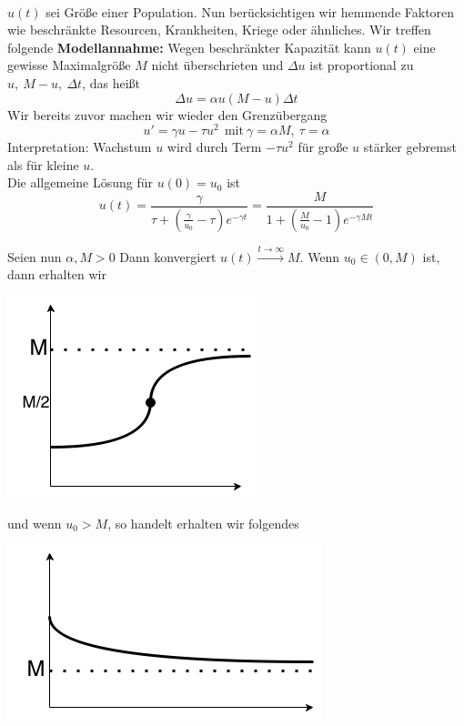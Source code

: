 \begin{beispiel}
\mbox{}\\
$u(t) $ sei Größe einer Population. Nun berücksichtigen wir  hemmende Faktoren wie beschränkte Resourcen, Krankheiten, Kriege oder ähnliches. Wir treffen folgende \textbf{Modellannahme:} Wegen beschränkter Kapazität kann $u(t) $
eine gewisse Maximalgröße $M$ nicht überschrieten und
$\Delta u $ ist proportional zu $u, \ M-u, \ \Delta t$, das heißt
\begin{equation*}
\Delta u = \alpha u(M-u) \Delta t 
\end{equation*}
Wir bereits zuvor machen wir wieder den Grenzübergang
\begin{equation*} 
u' = \gamma u - \tau u^2 \ \ \mathrm{mit\ }\gamma = \alpha M, \ \tau = \alpha
\end{equation*}  
Interpretation: Wachstum $u$ wird durch Term $-\tau u^2 $ für große $u$ 
stärker gebremst als für kleine $u$. \\

Die allgemeine Lösung für $u(0) = u_0 $ ist
\begin{equation*}
u(t) = \frac{\gamma}{\tau + \left(\frac{\gamma}{u_0} - \tau \right) e^{-\gamma t}}
= \frac{M}{1+\left(\frac{M}{u_0} - 1 \right) e^{-\gamma M t}}
\end{equation*}

Seien nun $\alpha, M > 0$ Dann konvergiert $u(t) \xrightarrow{t\rightarrow\infty} M $. Wenn $u_0 \in (0,M)$ ist, dann erhalten wir
\begin{center}
\includegraphics[scale=0.5]{pictures/011-01.png}
\end{center}
und wenn $u_0 >M$, so handelt erhalten wir folgendes
\begin{center}
\includegraphics[scale=0.5]{pictures/011-02.png}
\end{center}


\end{beispiel}

